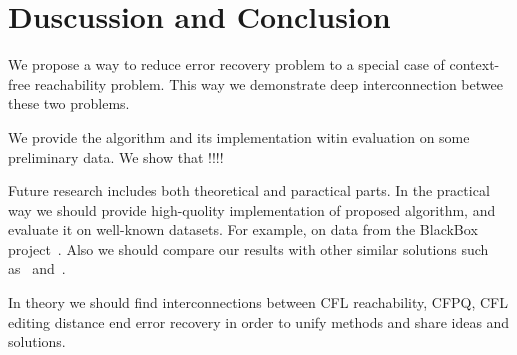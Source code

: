 \section{Duscussion and Conclusion}

We propose a way to reduce error recovery problem to a special case of context-free reachability problem.
This way we demonstrate deep interconnection betwee these two problems.

We provide the algorithm and its implementation witin evaluation on some preliminary data.
We show that !!!!

Future research includes both theoretical and paractical parts.
In the practical way we should provide high-quolity implementation of proposed algorithm, and evaluate it on well-known datasets.
For example, on data from the BlackBox project~\cite{!!!}.
Also we should compare our results with other similar solutions such as~\cite{!!!} and~\cite{!!!}.

In theory we should find interconnections between CFL reachability, CFPQ, CFL editing distance end error recovery in order to unify methods and share ideas and solutions.
